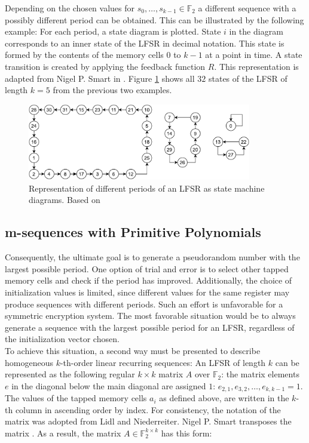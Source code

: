 Depending on the chosen values for $s_0,\ldots,s_{k-1}\in \mathbb{F}_2$ a different sequence with a possibly different period can be obtained. This can be illustrated by the following example: For each period, a state diagram is plotted. State $i$ in the diagram corresponds to an inner state of the LFSR in decimal notation. This state is formed by the contents of the memory cells $0$ to $k-1$ at a point in time. A state transition is created by applying the feedback function $R$. This representation is adapted from Nigel P. Smart in \cite[pp. 230]{Smart.2016}. Figure \ref{fig:Figure_6} shows all $32$ states of the LFSR of length $k=5$ from the previous two examples. 

\begin{figure}[h]
	\centering
	\includegraphics[width=0.87\textwidth]{carl/figures/figure_6_new_svg-raw.pdf}
	\caption{Representation of different periods of an LFSR as state machine diagrams. Based on \cite[pp. 230-232]{Smart.2016}}
	\label{fig:Figure_6}
\end{figure} 

\pagebreak

\subsection{m-sequences with Primitive Polynomials}
Consequently, the ultimate goal is to generate a pseudorandom number with the largest possible period. One option of trial and error is to select other tapped memory cells and check if the period has improved. Additionally, the choice of initialization values is limited, since different values for the same register may produce sequences with different periods. Such an effort is unfavorable for a symmetric encryption system. The most favorable situation would be to always generate a sequence with the largest possible period for an LFSR, regardless of the initialization vector chosen.\\

To achieve this situation, a second way must be presented to describe homogeneous $k$-th-order linear recurring sequences: An LFSR of length $k$ can be represented as the following regular $k\times{k}$ matrix $A$ over $\mathbb{F}_2$: the matrix elements $e$ in the diagonal below the main diagonal are assigned $1$: $e_{2,1},e_{3,2},\ldots,e_{k,k-1}=1$. The values of the tapped memory cells $a_i$ as defined above, are written in the $k$-th column in ascending order by index. \cite[p. 191]{Lidl.1986} For consistency, the notation of the matrix was adopted from Lidl and Niederreiter. Nigel P. Smart transposes the matrix \cite[p. 218]{Smart.2016}. As a result, the matrix $A\in \mathbb{F}_2^{k\times{k}}$ has this form:

